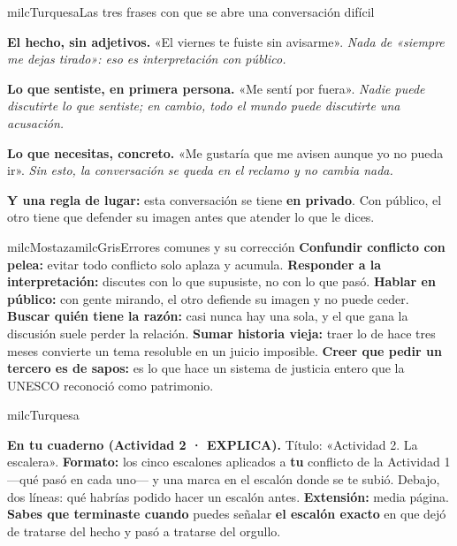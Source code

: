 \documentclass[11pt,letterpaper]{article}
\begin{document}
\begin{drawbox}{milcTurquesa}{Las tres frases con que se abre una conversación difícil}
\begin{pasoslista}
\item \textbf{El hecho, sin adjetivos.} «El viernes te fuiste sin avisarme». \emph{Nada de «siempre me dejas tirado»: eso es interpretación con público.}
\item \textbf{Lo que sentiste, en primera persona.} «Me sentí por fuera». \emph{Nadie puede discutirte lo que sentiste; en cambio, todo el mundo puede discutirte una acusación.}
\item \textbf{Lo que necesitas, concreto.} «Me gustaría que me avisen aunque yo no pueda ir». \emph{Sin esto, la conversación se queda en el reclamo y no cambia nada.}
\item \textbf{Y una regla de lugar:} esta conversación se tiene \textbf{en privado}. Con público, el otro tiene que defender su imagen antes que atender lo que le dices.
\end{pasoslista}
\end{drawbox}

\begin{softbox}{milcMostaza}{milcGris}{Errores comunes y su corrección}
\textbf{Confundir conflicto con pelea:} evitar todo conflicto solo aplaza y acumula. \textbf{Responder a la interpretación:} discutes con lo que supusiste, no con lo que pasó. \textbf{Hablar en público:} con gente mirando, el otro defiende su imagen y no puede ceder. \textbf{Buscar quién tiene la razón:} casi nunca hay una sola, y el que gana la discusión suele perder la relación. \textbf{Sumar historia vieja:} traer lo de hace tres meses convierte un tema resoluble en un juicio imposible. \textbf{Creer que pedir un tercero es de sapos:} es lo que hace un sistema de justicia entero que la UNESCO reconoció como patrimonio.
\end{softbox}

\begin{infoband}{milcTurquesa}


\textbf{En tu cuaderno (Actividad 2 · EXPLICA).} Título: «Actividad 2. La escalera». \textbf{Formato:} los cinco escalones aplicados a \textbf{tu} conflicto de la Actividad 1 ---qué pasó en cada uno--- y una marca en el escalón donde se te subió. Debajo, dos líneas: qué habrías podido hacer un escalón antes. \textbf{Extensión:} media página. \textbf{Sabes que terminaste cuando} puedes señalar \textbf{el escalón exacto} en que dejó de tratarse del hecho y pasó a tratarse del orgullo.
\end{infoband}
\end{document}
